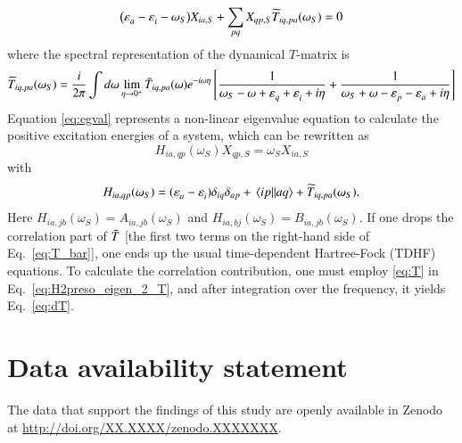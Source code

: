\documentclass[aip,jcp,reprint,noshowkeys,superscriptaddress]{revtex4-1}
\newcommand{\e}[2]{\eps_{#1}^{#2}}
\newcommand{\eps}{\varepsilon}
\begin{document}
\begin{equation}
	\label{eq:egval}
	\qty(\e{a}{}-\e{i}{}-\omega_S) X_{ia,S}+\sum_{pq}X_{qp,S}\widetilde{T}_{iq,pa}(\omega_S)=0
\end{equation}
where the spectral representation of the dynamical $T$-matrix is
\begin{equation}
	\widetilde{T}_{iq,pa}(\omega_S)
	= \frac{i}{2\pi}\int d\omega \lim_{\eta \to 0^+}\Bar{T}_{iq,pa}(\omega)e^{-i\omega\eta} \left[\frac{1}{\omega_S-\omega+\e{q}{}+\e{i}{}+i\eta}+\frac{1}{\omega_S+\omega-\e{p}{}-\e{a}{}+i\eta}\right] 
 \label{eq:H2preso_eigen_2_T}
\end{equation}
Equation \eqref{eq:egval} represents a non-linear eigenvalue equation to calculate the positive excitation energies of a system, which can be rewritten as
\begin{equation}
\label{eq:H2preso_eigen}
	H_{ia,qp}(\omega_S) X_{qp,S}=\omega_S X_{ia,S}
\end{equation}
with
\begin{equation}
	H_{ia,qp}(\omega_S)=(\e{a}{}-\e{i}{})\delta_{iq}\delta_{ap} + \mel{ip}{}{aq}+\widetilde{T}_{iq,pa}(\omega_S).
\end{equation}
Here $H_{ia,jb}(\omega_S)=A_{ia,jb}(\omega_S)$ and $H_{ia,bj}(\omega_S)=B_{ia,jb}(\omega_S)$.
If one drops the correlation part of $\Bar{T}$ [the first two terms on the right-hand side of Eq.~\eqref{eq:T_bar}], one ends up the usual time-dependent Hartree-Fock (TDHF) equations. 
To calculate the correlation contribution, one must employ \eqref{eq:T} in Eq.~\eqref{eq:H2preso_eigen_2_T}, and after integration over the frequency, it yields Eq.~\eqref{eq:dT}.

\twocolumngrid
\section*{Data availability statement}
The \hypertarget{SI}{data} that support the findings of this study are openly available in Zenodo at \href{http://doi.org/XX.XXXX/zenodo.XXXXXXX}{http://doi.org/XX.XXXX/zenodo.XXXXXXX}.


\end{document}
